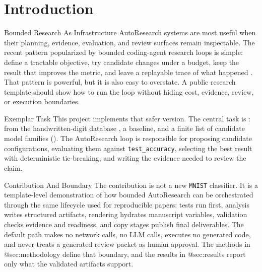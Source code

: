 \documentclass[
  ignorenonframetext,
]{beamer}
\author{\texorpdfstring{}{}}
\date{}
\begin{document}
\section{Introduction}\label{sec:introduction}

\begin{frame}[allowframebreaks]{Bounded Research As Infrastructure}
\protect{}\label{sec:bounded-research-infrastructure}
AutoResearch systems are most useful when their planning, evidence,
evaluation, and review surfaces remain inspectable. The recent pattern
popularized by bounded coding-agent research loops is simple: define a
tractable objective, try candidate changes under a budget, keep the
result that improves the metric, and leave a replayable trace of what
happened . That pattern is powerful,
but it is also easy to overstate. A public research template should show
how to run the loop without hiding cost, evidence, review, or execution
boundaries.
\end{frame}

\begin{frame}{Exemplar Task}
\protect{}\label{sec:exemplar-task}
This project implements that safer version. The central task is
:
 from the handwritten-digit
database , a 
baseline, and a finite list of candidate model families
().
The AutoResearch loop is responsible for proposing candidate
configurations, evaluating them against \texttt{test\_accuracy},
selecting the best result with deterministic tie-breaking, and writing
the evidence needed to review the claim.
\end{frame}

\begin{frame}{Contribution And Boundary}
\protect{}\label{sec:contribution-boundary}
The contribution is not a new \texttt{MNIST} classifier. It is a
template-level demonstration of how bounded AutoResearch can be
orchestrated through the same lifecycle used for reproducible papers:
tests run first, analysis writes structured artifacts, rendering
hydrates manuscript variables, validation checks evidence and readiness,
and copy stages publish final deliverables. The default path makes no
network calls, no LLM calls, executes no generated code, and never
treats a generated review packet as human approval. The methods in
@sec:methodology define that boundary, and the results in @sec:results
report only what the validated artifacts support.
\end{frame}
\end{document}
